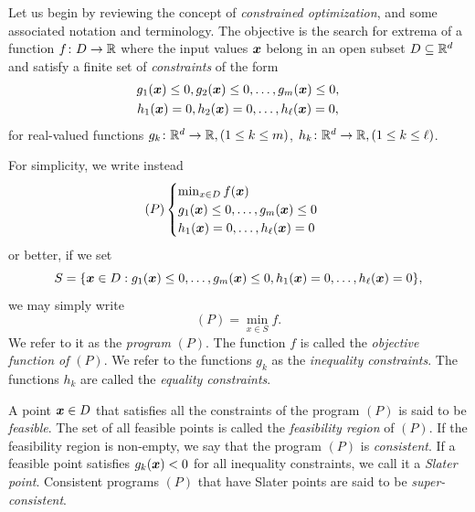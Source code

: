 

Let us begin by reviewing the concept of \emph{constrained optimization}, and some associated notation and terminology.  The objective is the search for extrema of a function $f \colon D \to \mathbb{R}$ where the input values $\boldsymbol{x}$ belong in an open subset $D \subseteq \mathbb{R}^d$ and satisfy a finite set of \emph{constraints} of the form
\begin{gather*}
g_1(\boldsymbol{x}) \leq 0, g_2(\boldsymbol{x}) \leq 0, \dotsc, g_m(\boldsymbol{x}) \leq 0, \\
h_1(\boldsymbol{x}) = 0, h_2(\boldsymbol{x}) = 0, \dotsc, h_\ell(\boldsymbol{x}) = 0,
\end{gather*}
for real-valued functions $g_k\colon \mathbb{R}^d \to \mathbb{R}, (1\leq k \leq m)$, $h_k \colon \mathbb{R}^d \to \mathbb{R}, (1\leq k \leq \ell)$.

For simplicity, we write instead
\begin{equation}\label{equation:programP}
(P) \begin{cases} \min_{x\in D}f(\boldsymbol{x}) \\ g_1(\boldsymbol{x}) \leq 0, \dotsc, g_m(\boldsymbol{x}) \leq 0 \\ h_1(\boldsymbol{x}) = 0, \dotsc, h_\ell(\boldsymbol{x}) =0 \end{cases}
\end{equation}
or better, if we set 
\begin{equation*}
S = \{ \boldsymbol{x} \in D : g_1(\boldsymbol{x}) \leq 0, \dotsc, g_m(\boldsymbol{x}) \leq 0, h_1(\boldsymbol{x}) = 0, \dotsc, h_\ell(\boldsymbol{x})=0\},
\end{equation*} we may simply write 
\begin{equation*}
(P) = \min_{x\in S} f.
\end{equation*}
We refer to it as the \emph{program} $(P)$. The function $f$ is called the \emph{objective function of }$(P)$.  We refer to the functions $g_k$ as the \emph{inequality constraints}.  The functions $h_k$ are called the \emph{equality constraints}.

A point $\boldsymbol{x} \in D$ that satisfies all the constraints of the program $(P)$ is said to be \emph{feasible}.  The set of all feasible points is called the \emph{feasibility region} of $(P)$.  If the feasibility region is non-empty, we say that the program $(P)$ is \emph{consistent}. If a feasible point satisfies $g_k(\boldsymbol{x}) < 0$ for all inequality constraints, we call it a \emph{Slater point}. Consistent programs $(P)$ that have Slater points are said to be \emph{super-consistent}.

